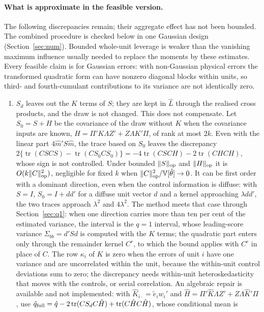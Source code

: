 \documentclass[11pt]{article}
\newcommand{\Var}{\mathbb{V}}
\newcommand{\tr}{\operatorname{tr}}
\begin{document}
\paragraph{What is approximate in the feasible version.} The following discrepancies remain; their aggregate effect
has not been bounded. The combined procedure is checked below in one Gaussian design (Section~\ref{sec:num}).
Bounded whole-unit leverage is weaker than the vanishing maximum influence usually needed to replace the moments by
these estimates. Every feasible claim is for Gaussian errors: with non-Gaussian physical errors the transformed
quadratic form can have nonzero diagonal blocks within units, so third- and fourth-cumulant contributions to its
variance are not identically zero.
\begin{enumerate}\itemsep1pt
\item $S_d$ leaves out the $K$ terms of $S$; they are kept in $\hat L$ through the realised cross products, and the
draw is not changed. This does not compensate. Let $S_0=S+H$ be the covariance of the draw without $K$ when the
covariance inputs are known, $H=\Pi'K\Lambda Z'+Z\Lambda K'\Pi$, of rank at most $2k$. Even with the linear part
$4\hat m'S\hat m$, the trace based on $S_0$ leaves the discrepancy
$2\{\tr(CSCS)-\tr(CS_0CS_0)\}=-4\tr(CSCH)-2\tr(CHCH)$, whose sign is not controlled. Under bounded $\|S\|_{\rm op}$ and
$\|H\|_{\rm op}$ it is $O(k\|C\|_{\rm op}^2)$, negligible for fixed $k$ when $\|C\|_{\rm op}^2/\Var[\hat\theta]\to0$.
It can be first order with a dominant direction, even when the control information is diffuse: with $S=I$,
$S_0=I+dd'$ for a diffuse unit vector $d$ and a kernel approaching $\lambda dd'$, the two traces approach $\lambda^2$
and $4\lambda^2$. The method meets that case through Section~\ref{sec:q1}: when one direction carries more than ten
per cent of the estimated variance, the interval is the $q=1$ interval, whose leading-score variance
$\Sigma_{bb}=d'Sd$ is computed with the $K$ terms; the quadratic part enters only through the remainder kernel $C^r$,
to which the bound applies with $C^r$ in place of $C$. The row $\kappa_i$ of $K$ is zero when the errors of unit $i$
have one variance and are uncorrelated within the unit, because the within-unit control deviations sum to zero; the
discrepancy needs within-unit heteroskedasticity that moves with the controls, or serial correlation. An algebraic
repair is available and not implemented: with $\hat K_{i\cdot}=\tilde e_iw_i'$ and
$\hat H=\Pi'\hat K\Lambda Z'+Z\Lambda\hat K'\Pi$, use
$\hat q_{\rm full}=\hat q-2\tr(CS_dC\hat H)+\tr(C\hat HC\hat H)$, whose conditional mean is

\end{enumerate}
\end{document}
